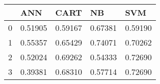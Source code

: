 \begin{tabular}{|l|l|l|l|l|}
\toprule
{} &      ANN &     CART &       NB &      SVM \\
\midrule
0 &  0.51905 &  0.59167 &  0.67381 &  0.59190 \\
1 &  0.55357 &  0.65429 &  0.74071 &  0.70262 \\
2 &  0.52024 &  0.69262 &  0.54333 &  0.72690 \\
3 &  0.39381 &  0.68310 &  0.57714 &  0.72690 \\
\bottomrule
\end{tabular}
